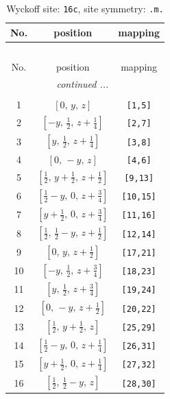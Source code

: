 \documentclass[fleqn,8pt]{jsarticle}
\begin{document}
\renewcommand{\arraystretch}{1.2}
\begin{longtable}{ccc}
\caption{Wyckoff site: {\tt 16c}, site symmetry: {\tt .m.}}
 \\
 \hline \hline
No. & position & mapping \\ \hline \endfirsthead

\multicolumn{2}{l}{\tablename\ \thetable{}} \\
 \hline \hline
No. & position & mapping \\ \hline \endhead

 \hline \hline
\multicolumn{2}{r}{\footnotesize\it continued ...} \\ \endfoot

 \hline \hline
\multicolumn{2}{r}{} \\ \endlastfoot

1 & $\left[ 0,\, y,\, z \right]$ & {\tt [1,5]} \\ \hline
2 & $\left[ - y,\, \frac{1}{2},\, z + \frac{1}{4} \right]$ & {\tt [2,7]} \\ \hline
3 & $\left[ y,\, \frac{1}{2},\, z + \frac{1}{4} \right]$ & {\tt [3,8]} \\ \hline
4 & $\left[ 0,\, - y,\, z \right]$ & {\tt [4,6]} \\ \hline
5 & $\left[ \frac{1}{2},\, y + \frac{1}{2},\, z + \frac{1}{2} \right]$ & {\tt [9,13]} \\ \hline
6 & $\left[ \frac{1}{2} - y,\, 0,\, z + \frac{3}{4} \right]$ & {\tt [10,15]} \\ \hline
7 & $\left[ y + \frac{1}{2},\, 0,\, z + \frac{3}{4} \right]$ & {\tt [11,16]} \\ \hline
8 & $\left[ \frac{1}{2},\, \frac{1}{2} - y,\, z + \frac{1}{2} \right]$ & {\tt [12,14]} \\ \hline
9 & $\left[ 0,\, y,\, z + \frac{1}{2} \right]$ & {\tt [17,21]} \\ \hline
10 & $\left[ - y,\, \frac{1}{2},\, z + \frac{3}{4} \right]$ & {\tt [18,23]} \\ \hline
11 & $\left[ y,\, \frac{1}{2},\, z + \frac{3}{4} \right]$ & {\tt [19,24]} \\ \hline
12 & $\left[ 0,\, - y,\, z + \frac{1}{2} \right]$ & {\tt [20,22]} \\ \hline
13 & $\left[ \frac{1}{2},\, y + \frac{1}{2},\, z \right]$ & {\tt [25,29]} \\ \hline
14 & $\left[ \frac{1}{2} - y,\, 0,\, z + \frac{1}{4} \right]$ & {\tt [26,31]} \\ \hline
15 & $\left[ y + \frac{1}{2},\, 0,\, z + \frac{1}{4} \right]$ & {\tt [27,32]} \\ \hline
16 & $\left[ \frac{1}{2},\, \frac{1}{2} - y,\, z \right]$ & {\tt [28,30]} \\
\end{longtable}
\end{document}
